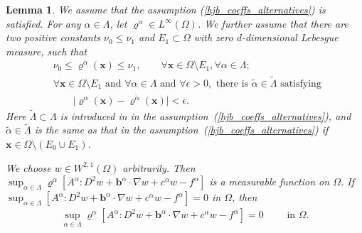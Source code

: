 \documentclass[12pt]{amsart}
\newcommand{\boldx}{\boldsymbol{x}}
\newtheorem{lemma}{Lemma}[section]
\theoremstyle{definition}
\theoremstyle{remark}
\begin{document}
\begin{lemma}
\label{lemma_hjb_equivalent}
We assume that the assumption (\ref{hjb_coeffs_alternatives}) is satisfied. 
For any $\alpha \in \Lambda$, let $\varrho^{\alpha} \in L^{\infty}(\Omega)$. 
We further assume that there are two positive constants $\nu_{0}\leq 
\nu_{1}$ and $E_{1} \subset \Omega$ with zero $d$-dimensional Lebesgue 
measure, such that 
\begin{subequations}
\label{weight_func_assumptions}
\begin{align}
\label{weight_func_assumption1}
& \nu_{0} \leq \varrho^{\alpha}(\boldx) \leq \nu_{1}, 
\qquad \forall \boldx \in \Omega \setminus E_{1}, 
\forall \alpha \in \Lambda; \\
\label{weight_func_assumption2}
& \forall \boldx\in \Omega \setminus E_{1} \text{ and } 
\forall \alpha \in \Lambda \text{ and } \forall \epsilon >0, 
\text{ there is } \tilde{\alpha} \in \tilde{\Lambda} \text{ satisfying } \\
\nonumber
& \qquad \vert \varrho^{\alpha}(\boldx) - \varrho^{\tilde{\alpha}}(\boldx) \vert 
< \epsilon.  
\end{align}
\end{subequations}
Here $\tilde{\Lambda} \subset \Lambda$ is introduced in in the assumption~(\ref{hjb_coeffs_alternatives}), 
and $\tilde{\alpha}\in \tilde{\Lambda}$ is the same as that in the 
assumption~(\ref{hjb_coeffs_alternatives}) if $\boldx \in \Omega \setminus (E_{0}\cup E_{1})$.

We choose $w \in W^{2,1}(\Omega)$ arbitrarily. Then 
$\sup_{\alpha\in \Lambda}\varrho^{\alpha}[A^{\alpha}:D^{2}w 
+ \boldsymbol{b}^{\alpha}\cdot \nabla w + c^{\alpha}w - f^{\alpha}]$ 
is a measurable function on $\Omega$.
If $\sup_{\alpha\in \Lambda}[A^{\alpha}:D^{2}w 
+ \boldsymbol{b}^{\alpha}\cdot \nabla w + c^{\alpha}w - f^{\alpha}] = 0$ 
in $\Omega$, then 
\begin{align*}
\sup_{\alpha\in \Lambda}\varrho^{\alpha}[A^{\alpha}:D^{2}w 
+ \boldsymbol{b}^{\alpha}\cdot \nabla w + c^{\alpha}w - f^{\alpha}] = 0 
\qquad \text{ in } \Omega.
\end{align*}
\end{lemma}
\end{document}
